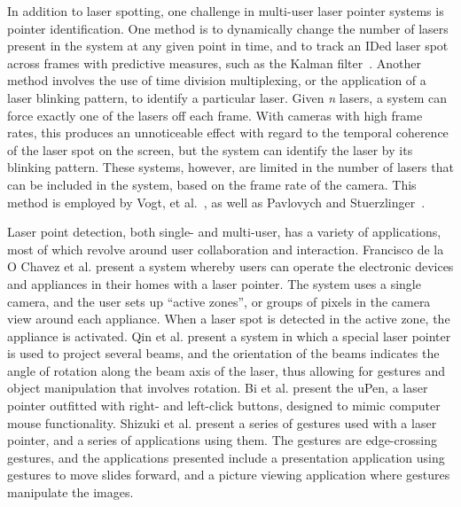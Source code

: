 In addition to laser spotting, one challenge in multi-user laser
pointer systems is pointer identification. One method is to
dynamically change the number of lasers present in the system at any
given point in time, and to track an IDed laser spot across frames
with predictive measures, such as the Kalman
filter~\cite{Oh02laserpointers,Davis00lumipoint:multi-user,Cheng:2003:DIL:857080.857088}.
Another method involves the use of time division multiplexing, or the
application of a laser blinking pattern, to identify a particular
laser. Given \emph{n} lasers, a system can force exactly one of the
lasers off each frame. With cameras with high frame rates, this
produces an unnoticeable effect with regard to the temporal coherence
of the laser spot on the screen, but the system can identify the laser
by its blinking pattern. These systems, however, are limited in the number of lasers
that can be included in the system, based on the frame rate of the camera.
This method is employed by Vogt, et
al.~\cite{Vogt:2004:ECG:1009379.1009663,Vogt03trackingmultiple}, as
well as Pavlovych and Stuerzlinger~\cite{Pavlovych04laserpointers}.

Laser point detection, both single- and multi-user, has a variety of
applications, most of which revolve around user collaboration and
interaction. Francisco de la O Chavez et al. \cite{delaOChavez:2008:INL:1387269.1387276} present a system
whereby users can operate the electronic devices and appliances in
their homes with a laser pointer. The system uses a
single camera, and the user sets up ``active zones'', or groups of
pixels in the camera view around each appliance. When a laser spot is
detected in the active zone, the appliance is activated. Qin et al. \cite{Qin:2010:SLP:1842993.1843022}
present a system in which a special laser pointer is used to project
several beams, and the orientation of the beams indicates the angle of
rotation along the beam axis of the laser, thus allowing for gestures
and object manipulation that involves rotation. Bi et al. \cite{BiUpen} present the uPen, a
laser pointer outfitted with right- and left-click buttons, designed
to mimic computer mouse functionality.
Shizuki et al. \cite{Shizuki:2006:LPI:1133265.1133284} present a series of 
gestures used with a laser pointer, and a series of applications using them.
The gestures are edge-crossing gestures, and the applications presented include 
a presentation application using gestures to move slides forward, and a picture 
viewing application where gestures manipulate the images.

